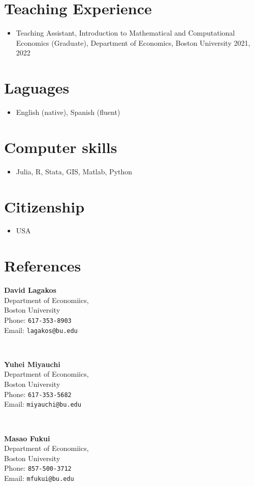 \documentclass[12pt]{article}
\newenvironment{customitemize}
{ \begin{itemize}[
	leftmargin=\parindent,
	itemindent=-0.5\parindent,
	topsep = 0pt, 
	itemsep = -1pt, 
	label={}] }
{\end{itemize} }
\begin{document}
\section*{Teaching Experience}

\begin{customitemize}
	\item Teaching Assistant, Introduction to Mathematical and Computational Economics (Graduate), Department of Economics, Boston University \hfill 2021, 2022
\end{customitemize}

\section*{Laguages}
\begin{customitemize}
\item English (native), Spanish (fluent)
\end{customitemize}

\section*{Computer skills}
\begin{customitemize}
\item Julia, R, Stata, GIS, Matlab, Python
\end{customitemize}

\section*{Citizenship}
\begin{customitemize}
\item USA
\end{customitemize}

\section*{References}
\begin{minipage}{0.3\textwidth}
\textbf{David Lagakos} \\
Department of Economiics,  \\
Boston University \\
Phone: \texttt{617-353-8903} \\
Email: \texttt{lagakos@bu.edu}
\end{minipage}
~
\begin{minipage}{0.3\textwidth}
\textbf{Yuhei Miyauchi} \\
Department of Economiics,  \\
Boston University \\
Phone: \texttt{617-353-5682} \\
Email: \texttt{miyauchi@bu.edu}
\end{minipage}
~
\begin{minipage}{0.3\textwidth}
\textbf{Masao Fukui} \\
Department of Economiics, \\
Boston University \\
Phone: \texttt{857-500-3712} \\
Email: \texttt{mfukui@bu.edu} 
\end{minipage}
\end{document}
